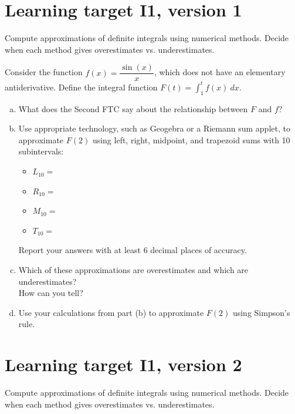 




\section{Learning target I1, version 1}
Compute approximations of definite integrals using numerical methods. Decide when each method gives overestimates vs. underestimates.

\hrulefill

Consider the function \(f(x)=\dfrac{\sin(x)}{x}\), which does not have an elementary antiderivative. Define the integral function \(F(t) = \displaystyle\int_1^t f(x)\ dx\).
\begin{enumerate}[(a)]
  \item What does the Second FTC say about the relationship between $F$ and $f$?
  \vfill

  \item Use appropriate technology, such as Geogebra or a Riemann sum applet, to approximate $F(2)$ using left, right, midpoint, and trapezoid sums with 10 subintervals:
  \begin{itemize}
    \item $L_{10}=$
    \item $R_{10}=$
    \item $M_{10}=$
    \item $T_{10}=$
  \end{itemize}
  Report your answers with at least 6 decimal places of accuracy.
  
  \item Which of these approximations are overestimates and which are underestimates? \\
  How can you tell?
  \vfill

  \item Use your calculations from part (b) to approximate $F(2)$ using Simpson's rule.
\end{enumerate}

\pagebreak

\section{Learning target I1, version 2}
Compute approximations of definite integrals using numerical methods. Decide when each method gives overestimates vs. underestimates.

